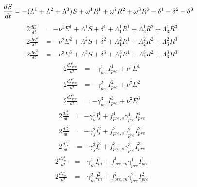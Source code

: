 \documentclass{article}%
\begin{document}
%
\begin{alignat}{2}%
\frac{dS}{dt} &= -( \Lambda^{1} +  \Lambda^{2} +  \Lambda^{3}) \-^{} S +  \omega^{1} R^{1} +  \omega^{2} R^{2} +  \omega^{3} R^{3} -\delta^{1} -\delta^{2} -\delta^{3}%
\end{alignat}%
\begin{alignat}{2}%
\frac{dE^{1}}{dt} &= -\nu^{1} E^{1} +  \Lambda^{1} S +  \delta^{1} +  \Lambda_{1}^{1} R^{1} +  \Lambda_{2}^{1} R^{2} +  \Lambda_{3}^{1} R^{3}%
\end{alignat}%
\begin{alignat}{2}%
\frac{dE^{2}}{dt} &= -\nu^{2} E^{2} +  \Lambda^{2} S +  \delta^{2} +  \Lambda_{1}^{2} R^{1} +  \Lambda_{2}^{2} R^{2} +  \Lambda_{3}^{2} R^{3}%
\end{alignat}%
\begin{alignat}{2}%
\frac{dE^{3}}{dt} &= -\nu^{3} E^{3} +  \Lambda^{3} S +  \delta^{3} +  \Lambda_{1}^{3} R^{1} +  \Lambda_{2}^{3} R^{2} +  \Lambda_{3}^{3} R^{3}%
\end{alignat}%
\begin{alignat}{2}%
\frac{dI_{pre}^{1}}{dt} &= -\gamma_{pre}^{1} I_{pre}^{1} +  \nu^{1} E^{1}%
\end{alignat}%
\begin{alignat}{2}%
\frac{dI_{pre}^{2}}{dt} &= -\gamma_{pre}^{2} I_{pre}^{2} +  \nu^{2} E^{2}%
\end{alignat}%
\begin{alignat}{2}%
\frac{dI_{pre}^{3}}{dt} &= -\gamma_{pre}^{3} I_{pre}^{3} +  \nu^{3} E^{3}%
\end{alignat}%
\begin{alignat}{2}%
\frac{dI_{s}^{1}}{dt} &= -\gamma_{s}^{1} I_{s}^{1} + f_{pre,s}^{1} \gamma_{pre}^{1} I_{pre}^{1}%
\end{alignat}%
\begin{alignat}{2}%
\frac{dI_{s}^{2}}{dt} &= -\gamma_{s}^{2} I_{s}^{2} + f_{pre,s}^{2} \gamma_{pre}^{2} I_{pre}^{2}%
\end{alignat}%
\begin{alignat}{2}%
\frac{dI_{s}^{3}}{dt} &= -\gamma_{s}^{3} I_{s}^{3} + f_{pre,s}^{3} \gamma_{pre}^{3} I_{pre}^{3}%
\end{alignat}%
\begin{alignat}{2}%
\frac{dI_{m}^{1}}{dt} &= -\gamma_{m}^{1} I_{m}^{1} + f_{pre,m}^{1} \gamma_{pre}^{1} I_{pre}^{1}%
\end{alignat}%
\begin{alignat}{2}%
\frac{dI_{m}^{2}}{dt} &= -\gamma_{m}^{2} I_{m}^{2} + f_{pre,m}^{2} \gamma_{pre}^{2} I_{pre}^{2}%
\end{alignat}%
\end{document}
